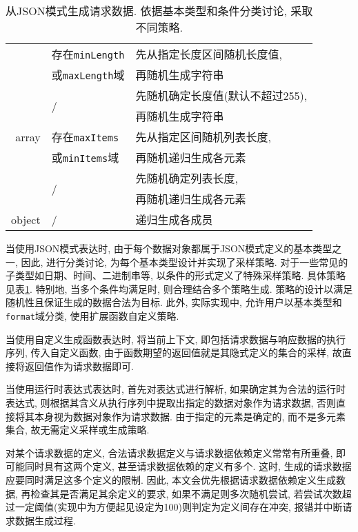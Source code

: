 \begin{table}[!htb]
\begin{tabular}{rll}
                & 存在\texttt{minLength} & 先从指定长度区间随机长度值, \\
                & 或\texttt{maxLength}域 & 再随机生成字符串 \\
                \cline{2-3}
                & \multirow{2}{*}{/} & 先随机确定长度值(默认不超过255),\\
                & & 再随机生成字符串 \\
                \hline
                array & 存在\texttt{maxItems} & 先从指定区间随机列表长度,\\
                & 或\texttt{minItems}域 & 再随机递归生成各元素 \\
                \cline{2-3}
                & \multirow{2}{*}{/} & 先随机确定列表长度,\\
                & & 再随机递归生成各元素 \\
                \hline
                object & / & 递归生成各成员 \\
                \bottomrule
            \end{tabular}
            \caption{从JSON模式生成请求数据. 依据基本类型和条件分类讨论, 采取不同策略.}
            \label{tab:schemagen}
        \end{table}
    
        当使用JSON模式表达时, 由于每个数据对象都属于JSON模式定义的基本类型之一, 因此, 进行分类讨论, 为每个基本类型设计并实现了采样策略. 对于一些常见的子类型如日期、时间、二进制串等, 以条件的形式定义了特殊采样策略. 具体策略见表\ref{tab:schemagen}. 特别地, 当多个条件均满足时, 则合理结合多个策略生成. 策略的设计以满足随机性且保证生成的数据合法为目标. 此外, 实际实现中, 允许用户以基本类型和\texttt{format}域分类, 使用扩展函数自定义策略.
        
        当使用自定义生成函数表达时, 将当前上下文, 即包括请求数据与响应数据的执行序列, 传入自定义函数, 由于函数期望的返回值就是其隐式定义的集合的采样, 故直接将返回值作为请求数据即可.
        
        当使用运行时表达式表达时, 首先对表达式进行解析, 如果确定其为合法的运行时表达式, 则根据其含义从执行序列中提取出指定的数据对象作为请求数据, 否则直接将其本身视为数据对象作为请求数据. 由于指定的元素是确定的, 而不是多元素集合, 故无需定义采样或生成策略.
        
        对某个请求数据的定义, 合法请求数据定义与请求数据依赖定义常常有所重叠, 即可能同时具有这两个定义, 甚至请求数据依赖的定义有多个. 这时, 生成的请求数据应要同时满足这多个定义的限制. 因此, 本文会优先根据请求数据依赖定义生成数据, 再检查其是否满足其余定义的要求, 如果不满足则多次随机尝试, 若尝试次数超过一定阈值(实现中为方便起见设定为100)则判定为定义间存在冲突, 报错并中断请求数据生成过程.
        
